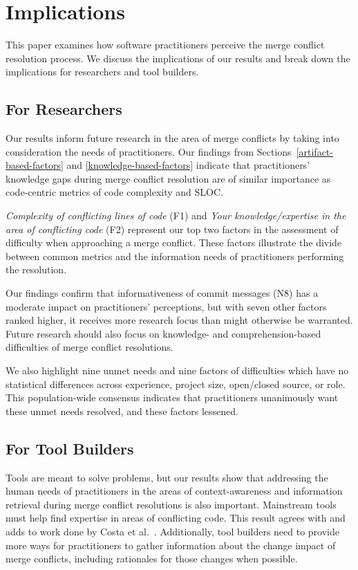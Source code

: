 \section{Implications}\label{implications}
This paper examines how software practitioners perceive the merge conflict resolution process.
We discuss the implications of our results and break down the implications for researchers and tool builders.

\subsection{For Researchers}
Our results inform future research in the area of merge conflicts by taking into consideration the needs of practitioners.
Our findings from Sections~\ref{artifact-based-factors} and \ref{knowledge-based-factors} indicate that practitioners' knowledge gaps during merge conflict resolution are of similar importance as code-centric metrics of code complexity and SLOC.

\textit{Complexity of conflicting lines of code} (F1) and \textit{Your knowledge/expertise in the area of conflicting code} (F2) represent our top two factors in the assessment of difficulty when approaching a merge conflict.
These factors illustrate the divide between common metrics and the information needs of practitioners performing the resolution.
 
Our findings confirm that informativeness of commit messages (N8) has a moderate impact on practitioners' perceptions, but with seven other factors ranked higher, it receives more research focus than might otherwise be warranted.
Future research should also focus on knowledge- and comprehension-based difficulties of  merge conflict resolutions.

We also highlight nine unmet needs and nine factors of difficulties which have no statistical differences across experience, project size, open/closed source, or role.
This population-wide consensus indicates that practitioners unanimously want these unmet needs resolved, and these factors lessened.

\subsection{For Tool Builders}
Tools are meant to solve problems, but our results show that addressing the human needs of  practitioners in the areas of context-awareness and information retrieval during merge conflict resolutions is also important.
Mainstream tools must help find expertise in areas of conflicting code.
This result agrees with and adds to work done by Costa et al.~\cite{CostaSarma}.
Additionally, tool builders need to provide more ways for practitioners to gather information about the change impact of merge conflicts, including rationales for those changes when possible.


